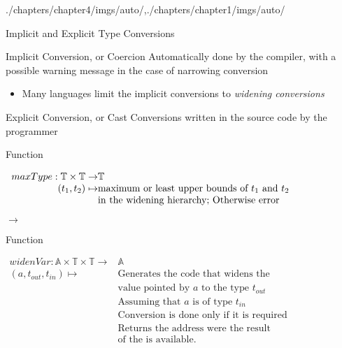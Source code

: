 \begin{graphicspathcontext}{{./chapters/chapter4/imgs/auto/},{./chapters/chapter1/imgs/auto/}}
\begin{bibunit}[apalike]
\begin{frame}{{Implicit and Explicit} Type Conversions}
	\begin{definitionblock}{Implicit Conversion, or Coercion}
		Automatically done by the compiler, with a possible warning message in the case of narrowing conversion
	\end{definitionblock}
	\begin{itemize}
		\item Many languages limit the implicit conversions to \emph{widening conversions}
	\end{itemize}
	\vspace{1cm}
	\begin{definitionblock}{Explicit Conversion, or Cast}
		Conversions written in the source code by the programmer
	\end{definitionblock}
\end{frame}

\begin{frame}[t]{Function }
	\begin{definition}
		$\begin{array}{r@{}l}
			maxType : \mathbb{T} \times \mathbb{T} \rightarrow & \mathbb{T} \\
			(t_1, t_2) \mapsto & \text{maximum or least upper bounds of }t_1\text{ and }t_2 \\
			& \text{in the widening hierarchy; Otherwise error} \\
		\end{array}$
	\end{definition}
	\begin{example}
		 $\rightarrow$ 
		\hspace{2em}
	\end{example}
\end{frame}

\begin{frame}{Function }
	\begin{definition}
		$\begin{array}{rl}
			widenVar : \mathbb{A} \times \mathbb{T} \times \mathbb{T} \rightarrow & \mathbb{A} \\
			(a, t_{out}, t_{in}) \mapsto & \text{Generates the code that widens the} \\
			& \text{value pointed by }a\text{ to the type }t_{out} \\[.2cm]
			& \text{Assuming that }a\text{ is of type }t_{in} \\[.2cm]
			& \text{Conversion is done only if it is required} \\[.2cm]
			& \text{Returns the address were the result} \\
			& \text{of the is available.} \\
		\end{array}$
	\end{definition}
\end{frame}


\end{bibunit}
\end{graphicspathcontext}
